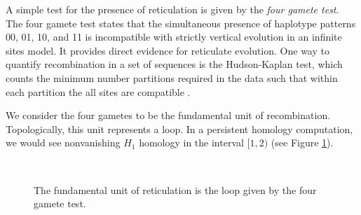 A simple test for the presence of reticulation is given by the \emph{four gamete test}.
The four gamete test states that the simultaneous presence of haplotype patterns 00, 01, 10, and 11 is incompatible with strictly vertical evolution in an infinite sites model.
It provides direct evidence for reticulate evolution.
One way to quantify recombination in a set of sequences is the Hudson-Kaplan test, which counts the minimum number partitions required in the data such that within each partition the all sites are compatible \citep{Hudson:1985}.

We consider the four gametes to be the fundamental unit of recombination.
Topologically, this unit represents a loop.
In a persistent homology computation, we would see nonvanishing $H_1$ homology in the interval $[1,2)$ (see Figure \ref{fig:fig2}).

\begin{figure}
  \centering
  ~
  ~
  \caption{The fundamental unit of reticulation is the loop given by the four gamete test.}
  \label{fig:fig2}
\end{figure}

